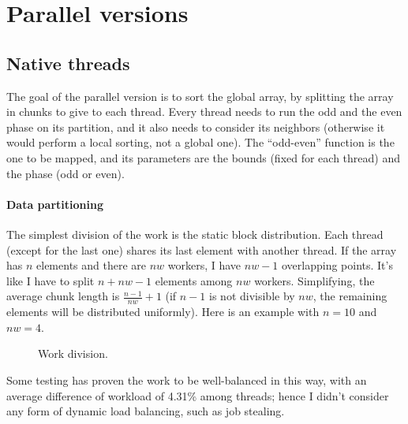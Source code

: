 \section{Parallel versions}

\subsection{Native threads}
The goal of the parallel version is to sort the global array, by splitting the array in chunks to give to each thread. Every thread needs to run the odd and the even phase on its partition, and it also needs to consider its neighbors (otherwise it would perform a local sorting, not a global one). The ``odd-even'' function is the one to be mapped, and its parameters are the bounds (fixed for each thread) and the phase (odd or even).

\paragraph{Data partitioning}
The simplest division of the work is the static block distribution. Each thread (except for the last one) shares its last element with another thread. If the array has $n$ elements and there are $nw$ workers, I have $nw - 1$ overlapping points. It's like I have to split $n + nw - 1$ elements among $nw$ workers. Simplifying, the average chunk length is $\frac{n - 1}{nw} + 1$ (if $n - 1$ is not divisible by $nw$, the remaining elements will be distributed uniformly). Here is an example with $n = 10$ and $nw = 4$.

\begin{center}
	\begin{figure}[ht!]
		\caption{Work division.} \label{array}
	\end{figure}
\end{center}
Some testing has proven the work to be well-balanced in this way, with an average difference of workload of 4.31\% among threads; hence I didn't consider any form of dynamic load balancing, such as job stealing.

